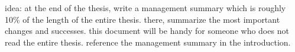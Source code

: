 idea: at the end of the thesis, write a management summary which is roughly 10\% of the length of the entire thesis. there, summarize the most important changes and successes. this document will be handy for someone who does not read the entire thesis. reference the management summary in the introduction.